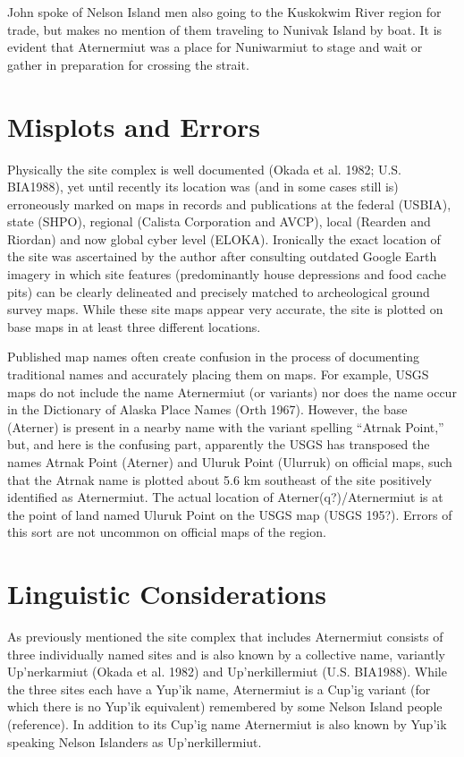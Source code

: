 John spoke of Nelson Island men also going to the Kuskokwim River region for trade, but makes no mention of them traveling to Nunivak Island by boat. It is evident that Aternermiut was a place for Nuniwarmiut to stage and wait or gather in preparation for crossing the strait.


\section{Misplots and Errors}

Physically the site complex is well documented (Okada et al. 1982; U.S. BIA1988), yet until recently its location was (and in some cases still is) erroneously marked on maps in records and publications at the federal (USBIA), state (SHPO), regional (Calista Corporation and AVCP), local (Rearden and Riordan) and now global cyber level (ELOKA). Ironically the exact location of the site was ascertained by the author after consulting outdated Google Earth imagery in which site features (predominantly house depressions and food cache pits) can be clearly delineated and precisely matched to archeological ground survey maps. While these site maps appear very accurate, the site is plotted on base maps in at least three different locations.

Published map names often create confusion in the process of documenting traditional names and accurately placing them on maps. For example, USGS maps do not include the name Aternermiut (or variants) nor does the name occur in the Dictionary of Alaska Place Names (Orth 1967). However, the base (Aterner) is present in a nearby name with the variant spelling “Atrnak Point,” but, and here is the confusing part, apparently the USGS has transposed the names Atrnak Point (Aterner) and Uluruk Point (Ulurruk) on official maps, such that the Atrnak name is plotted about 5.6 km southeast of the site positively identified as Aternermiut. The actual location of Aterner(q?)/Aternermiut is at the point of land named Uluruk Point on the USGS map (USGS 195?). Errors of this sort are not uncommon on official maps of the region.


\section{Linguistic Considerations}

As previously mentioned the site complex that includes Aternermiut consists of three individually named sites and is also known by a collective name, variantly Up’nerkarmiut (Okada et al. 1982) and Up’nerkillermiut (U.S. BIA1988). While the three sites each have a Yup’ik name, Aternermiut is a Cup’ig variant (for which there is no Yup’ik equivalent) remembered by some Nelson Island people (reference). In addition to its Cup’ig name Aternermiut is also known by Yup’ik speaking Nelson Islanders as Up’nerkillermiut.

